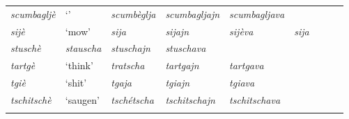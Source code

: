 \begin{sidewaystable}
\begin{tabularx}{\textwidth}{lllllllll}
	\textit{scumbagljè} & `' & \textit{scumbèglja} & \textit{scumbagljajn} & \textit{scumbagljava}\\
	\textit{sijè} & `mow' & \textit{sija} & \textit{sijajn} & \textit{sijèva} & \textit{sija}\\
	\textit{stuschè} & \textit{stauscha} & \textit{stuschajn} & \textit{stuschava} & &\\
	\textit{tartgè} & `think' & \textit{tratscha} & \textit{tartgajn} & \textit{tartgava} \\
	\textit{tgiè} & `shit' & \textit{tgaja} & \textit{tgiajn} & \textit{tgiava} & & & \\
	\textit{tschitschè} & `saugen' & \textit{tschétscha} & \textit{tschitschajn} & \textit{tschitschava} \\
		
		\lspbottomrule
	\end{tabularx} 
\end{sidewaystable}


